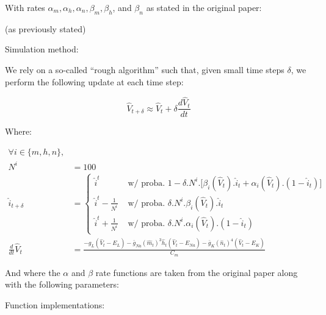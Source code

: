 \documentclass[
]{article}
\begin{document}
With rates \(\alpha_m, \alpha_h, \alpha_n, \beta_m, \beta_h\), and
\(\beta_n\) as stated in the original paper:

(as previously stated)

Simulation method:

We rely on a so-called ``rough algorithm'' such that, given small time
steps \(\delta\), we perform the following update at each time step:

\[\hat{V}_{t+\delta}\approx\hat{V}_t+\delta\frac{d\hat{V}_t}{dt}\]

Where:

\begin{align}
\forall i\in\{m,h,n\},\\
N^i&=100\\
\hat{i}_{t+\delta}&=
  \begin{cases}
    \hat{i}^t & \text{ w/ proba. }1 - \delta.N^i.\big[\beta_i(\hat{V}_t).\hat{i}_t + \alpha_i(\hat{V}_t).(1-\hat{i}_t)\big]\\
    \hat{i}^t-\frac{1}{N^i} & \text{ w/ proba. }\delta.N^i.\beta_i(\hat{V}_t).\hat{i}_t\\
    \hat{i}^t+\frac{1}{N^i} & \text{ w/ proba. }\delta.N^i.\alpha_i(\hat{V}_t).(1-\hat{i}_t)
  \end{cases}\\
\frac{d}{dt}\hat{V}_t &= \frac{-g_L(\hat{V}_t - E_L) - \bar{g}_{Na} (\hat{m}_t)^3 \hat{h}_t (\hat{V}_t - E_{Na}) - \bar{g}_K(\hat{n}_t)^4 (\hat{V}_t - E_K)}{C_m}
\end{align}

And where the \(\alpha\) and \(\beta\) rate functions are taken from the
original paper along with the following parameters:

Function implementations:
\end{document}
